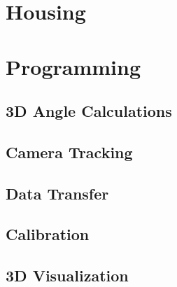 \section{Housing}


\section{Programming}

\subsection{3D Angle Calculations}

\subsection{Camera Tracking}

\subsection{Data Transfer}

\subsection{Calibration}

\subsection{3D Visualization}
